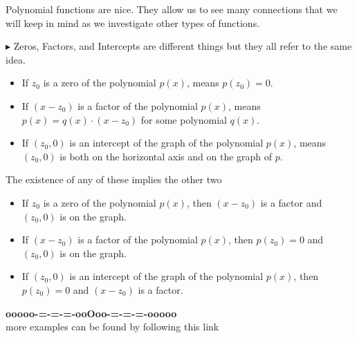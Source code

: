 \documentclass{ximera}
\begin{document}
Polynomial functions are nice.  They allow us to see many connections that we will keep in mind as we investigate other types of functions.


\textbf{\textcolor{red!70!darkgray}{$\blacktriangleright$}} Zeros, Factors, and Intercepts are different things but they all refer to the same idea.





\begin{itemize}

\item If $z_0$ is a zero of the polynomial $p(x)$, means $p(z_0)=0$.


\item If $(x-z_0)$ is a factor of the polynomial $p(x)$, means $p(x) = q(x) \cdot (x-z_0)$ for some polynomial $q(x)$.


\item If $(z_0,0)$ is an intercept of the graph of the polynomial $p(x)$, means $(z_0,0)$ is both on the horizontal axis and on the graph of $p$.

\end{itemize}


The existence of any of these implies the other two






\begin{itemize}

\item If $z_0$ is a zero of the polynomial $p(x)$, then $(x-z_0)$ is a factor and $(z_0,0)$ is on the graph.


\item If $(x-z_0)$ is a factor of the polynomial $p(x)$, then $p(z_0)=0$ and $(z_0,0)$ is on the graph.


\item If $(z_0,0)$ is an intercept of the graph of the polynomial $p(x)$, then $p(z_0)=0$ and $(x-z_0)$ is a factor.

\end{itemize}














\begin{center}
\textbf{\textcolor{green!50!black}{ooooo-=-=-=-ooOoo-=-=-=-ooooo}} \\

more examples can be found by following this link\\ 

\end{center}
\end{document}
